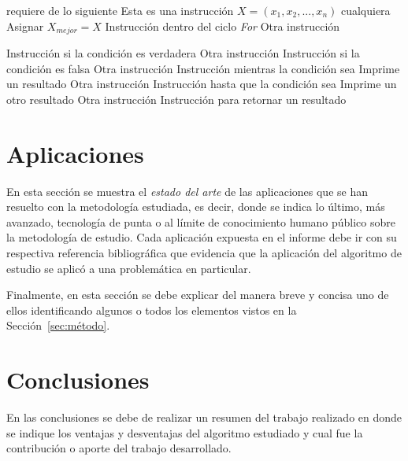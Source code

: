 \documentclass[journal]{IEEEtran}
\begin{document}
\begin{algorithm}
    \footnotesize
    \caption{Ejemplo de un algortimo en \LaTeX}
    \label{alg:ejemplo}
    \begin{algorithmic}[1]
        \REQUIRE requiere de lo siguiente
        \STATE Esta es una instrucción $X=({x}_{1}, {x}_{2}, ..., {x}_{n})$ cualquiera
        \STATE Asignar ${X}_{mejor}=X$  
            \STATE Instrucción dentro del ciclo \emph{For}
            \STATE Otra instrucción
        
                \STATE Instrucción si la condición es verdadera
                \STATE Otra instrucción
            \ELSE
                \STATE Instrucción si la condición es falsa
                \STATE Otra instrucción
            \ENDIF
        \ENDFOR
            \STATE Instrucción mientras la condición sea \TRUE
            \PRINT Imprime un resultado
            \STATE Otra instrucción
        \ENDWHILE
        \REPEAT
            \STATE Instrucción hasta que la condición sea \FALSE
            \PRINT Imprime un otro resultado
            \STATE Otra instrucción  
        \RETURN Instrucción para retornar un resultado
    \end{algorithmic}
\end{algorithm}



\section{Aplicaciones} \label{sec:aplicaciones}
En esta sección se muestra el \textit{estado del arte} de las aplicaciones que se han resuelto con la metodología estudiada, es decir, donde se indica lo último, más avanzado, tecnología de punta o al límite de conocimiento humano público sobre la metodología de estudio. Cada aplicación expuesta en el informe debe ir con su respectiva referencia bibliográfica que evidencia que la aplicación del algoritmo de estudio se aplicó a una problemática en particular.

Finalmente, en esta sección se debe explicar del manera breve y concisa uno de ellos identificando algunos o todos los elementos vistos en la Sección~\ref{sec:método}.


\section{Conclusiones} \label{sec:conclusiones}
En las conclusiones se  debe de realizar un resumen del trabajo realizado en donde se indique los ventajas y desventajas del algoritmo estudiado y cual fue la contribución o aporte del trabajo desarrollado.




\end{document}
